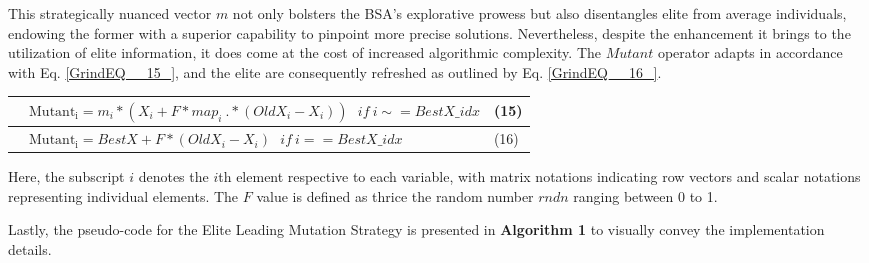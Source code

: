 \documentclass{article} %
\begin{document}
 This strategically nuanced vector $m$ not only bolsters the BSA's explorative prowess but also disentangles elite from average individuals, endowing the former with a superior capability to pinpoint more precise solutions. Nevertheless, despite the enhancement it brings to the utilization of elite information, it does come at the cost of increased algorithmic complexity. The $Mutant$ operator adapts in accordance with Eq. \eqref{GrindEQ__15_}, and the elite are consequently refreshed as outlined by Eq. \eqref{GrindEQ__16_}.

\begin{tabular}{|p{0.3in}|p{3.4in}|p{0.3in}|} \hline 
 & ${\mathrm{Mutant}}_{\mathrm{i}}=m_i*\left(X_i+F*map_i\ .*\left(OldX_i-X_i\right)\right)\ \ \ if\ i\sim =BestX\_idx$ & (15) \\ \hline 
 & ${\mathrm{Mutant}}_{\mathrm{i}}=BestX+F*\left(OldX_i-X_i\right)\ \ \ if\ i==BestX\_idx$ & (16) \\ \hline 
\end{tabular}

Here, the subscript $i$ denotes the $i$th element respective to each variable, with matrix notations indicating row vectors and scalar notations representing individual elements. The $F$ value is defined as thrice the random number $rndn$ ranging between 0 to 1. 

Lastly, the pseudo-code for the Elite Leading Mutation Strategy is presented in \textbf{Algorithm 1} to visually convey the implementation details.
\end{document}
